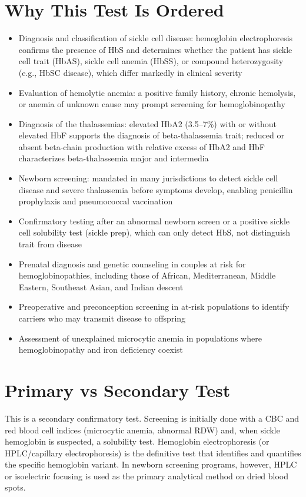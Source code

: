 \section*{Why This Test Is Ordered}
\begin{itemize}
  \item Diagnosis and classification of sickle cell disease: hemoglobin electrophoresis confirms the presence of HbS and determines whether the patient has sickle cell trait (HbAS), sickle cell anemia (HbSS), or compound heterozygosity (e.g., HbSC disease), which differ markedly in clinical severity
  \item Evaluation of hemolytic anemia: a positive family history, chronic hemolysis, or anemia of unknown cause may prompt screening for hemoglobinopathy
  \item Diagnosis of the thalassemias: elevated HbA2 (3.5--7\%) with or without elevated HbF supports the diagnosis of beta-thalassemia trait; reduced or absent beta-chain production with relative excess of HbA2 and HbF characterizes beta-thalassemia major and intermedia
  \item Newborn screening: mandated in many jurisdictions to detect sickle cell disease and severe thalassemia before symptoms develop, enabling penicillin prophylaxis and pneumococcal vaccination
  \item Confirmatory testing after an abnormal newborn screen or a positive sickle cell solubility test (sickle prep), which can only detect HbS, not distinguish trait from disease \cite{ryan2010significant}
  \item Prenatal diagnosis and genetic counseling in couples at risk for hemoglobinopathies, including those of African, Mediterranean, Middle Eastern, Southeast Asian, and Indian descent
  \item Preoperative and preconception screening in at-risk populations to identify carriers who may transmit disease to offspring
  \item Assessment of unexplained microcytic anemia in populations where hemoglobinopathy and iron deficiency coexist
\end{itemize}

\section*{Primary vs Secondary Test}
This is a secondary confirmatory test. Screening is initially done with a CBC and red blood cell indices (microcytic anemia, abnormal RDW) and, when sickle hemoglobin is suspected, a solubility test. Hemoglobin electrophoresis (or HPLC/capillary electrophoresis) is the definitive test that identifies and quantifies the specific hemoglobin variant. In newborn screening programs, however, HPLC or isoelectric focusing is used as the primary analytical method on dried blood spots.

